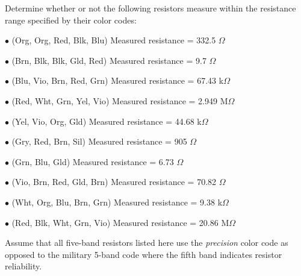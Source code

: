 

Determine whether or not the following resistors measure within the resistance range specified by their color codes:

\medskip
\item{$\bullet$} (Org, Org, Red, Blk, Blu) Measured resistance = 332.5 $\Omega$
\item{$\bullet$} (Brn, Blk, Blk, Gld, Red) Measured resistance = 9.7 $\Omega$ 
\item{$\bullet$} (Blu, Vio, Brn, Red, Grn) Measured resistance = 67.43 k$\Omega$ 
\item{$\bullet$} (Red, Wht, Grn, Yel, Vio) Measured resistance = 2.949 M$\Omega$
\item{$\bullet$} (Yel, Vio, Org, Gld) Measured resistance = 44.68 k$\Omega$ 
\item{$\bullet$} (Gry, Red, Brn, Sil) Measured resistance = 905 $\Omega$ 
\item{$\bullet$} (Grn, Blu, Gld) Measured resistance = 6.73 $\Omega$ 
\item{$\bullet$} (Vio, Brn, Red, Gld, Brn) Measured resistance = 70.82 $\Omega$
\item{$\bullet$} (Wht, Org, Blu, Brn, Grn) Measured resistance = 9.38 k$\Omega$
\item{$\bullet$} (Red, Blk, Wht, Grn, Vio) Measured resistance = 20.86 M$\Omega$ 
\medskip

Assume that all five-band resistors listed here use the {\it precision} color code as opposed to the military 5-band code where the fifth band indicates resistor reliability.







